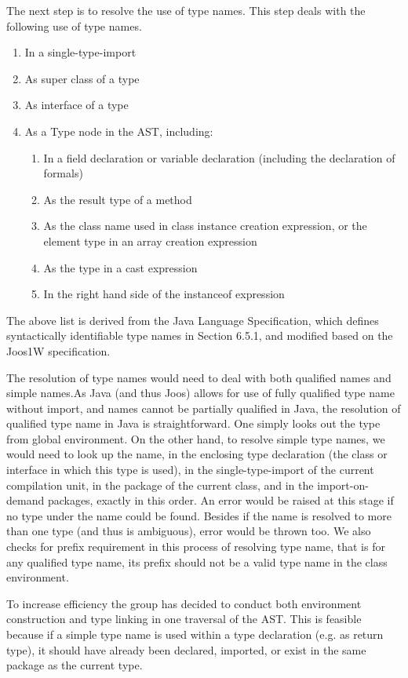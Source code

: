 \documentclass[a4paper, notitlepage]{report}
\begin{document}
The next step is to resolve the use of type names. This step deals with the following use of type names.
\begin{enumerate}
\item In a single-type-import
\item As super class of a type
\item As interface of a type
\item As a Type node in the AST, including:
	\begin{enumerate}
	\item In a field declaration or variable declaration (including the declaration of formals)
	\item As the result type of a method
	\item As the class name used in class instance creation expression, or the element type in an array creation expression
	\item As the type in a cast expression
	\item In the right hand side of the instanceof expression
	\end{enumerate}
\end{enumerate}
The above list is derived from the Java Language Specification, which defines syntactically identifiable type names in Section 6.5.1, and modified based on the Joos1W specification. 

The resolution of type names would need to deal with both qualified names and simple names.As Java (and thus Joos) allows for use of fully qualified type name without import, and names cannot be partially qualified in Java, the resolution of qualified type name in Java is straightforward. One simply looks out the type from global environment. On the other hand, to resolve simple type names, we would need to look up the name, in the enclosing type declaration (the class or interface in which this type is used), in the single-type-import of the current compilation unit, in the package of the current class, and in the import-on-demand packages, exactly in this order. An error would be raised at this stage if no type under the name could be found. Besides if the name is resolved to more than one type (and thus is ambiguous), error would be thrown too. We also checks for prefix requirement in this process of resolving type name, that is for any qualified type name, its prefix should not be a valid type name in the class environment.

To increase efficiency the group has decided to conduct both environment construction and type linking in one traversal of the AST. This is feasible because if a simple type name is used within a type declaration (e.g. as return type), it should have already been declared, imported, or exist in the same package as the current type. 
\end{document}
